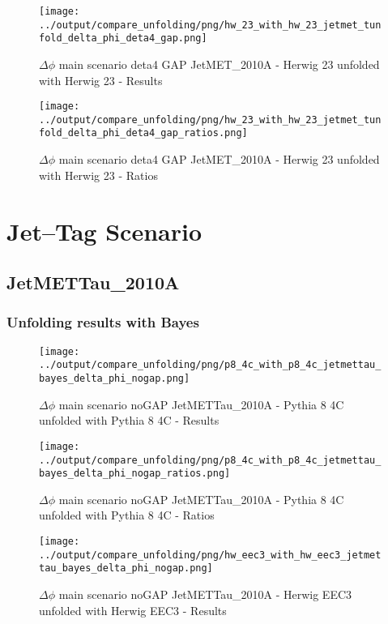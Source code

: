 \documentclass[11pt]{book}
\begin{document}
\begin{figure}[ht]
\centering
\texttt{[image: ../output/compare\_unfolding/png/hw\_23\_with\_hw\_23\_jetmet\_tunfold\_delta\_phi\_deta4\_gap.png]}
\caption{$\Delta\phi$ main scenario deta4 GAP JetMET\_2010A - Herwig 23 unfolded with Herwig 23 - Results}
\label{hw_23_hw_23_jetmet_tunfold_delta_phi_deta4_gap_a}
\end{figure}

\begin{figure}[ht]
\centering
\texttt{[image: ../output/compare\_unfolding/png/hw\_23\_with\_hw\_23\_jetmet\_tunfold\_delta\_phi\_deta4\_gap\_ratios.png]}
\caption{$\Delta\phi$ main scenario deta4 GAP JetMET\_2010A - Herwig 23 unfolded with Herwig 23 - Ratios}
\label{hw_23_hw_23_jetmet_tunfold_delta_phi_deta4_gap_b}
\end{figure}





\cleardoublepage
\chapter{Jet--Tag Scenario}
\section{JetMETTau\_2010A}
\subsection{Unfolding results with Bayes}

\begin{figure}[ht]
\centering
\texttt{[image: ../output/compare\_unfolding/png/p8\_4c\_with\_p8\_4c\_jetmettau\_bayes\_delta\_phi\_nogap.png]}
\caption{$\Delta\phi$ main scenario noGAP JetMETTau\_2010A - Pythia 8 4C unfolded with Pythia 8 4C - Results}
\label{p8_p8_jetmettau_bayes_delta_phi_nogap_a}
\end{figure}

\begin{figure}[ht]
\centering
\texttt{[image: ../output/compare\_unfolding/png/p8\_4c\_with\_p8\_4c\_jetmettau\_bayes\_delta\_phi\_nogap\_ratios.png]}
\caption{$\Delta\phi$ main scenario noGAP JetMETTau\_2010A - Pythia 8 4C unfolded with Pythia 8 4C - Ratios}
\label{p8_p8_jetmettau_bayes_delta_phi_nogap_b}
\end{figure}

\begin{figure}[ht]
\centering
\texttt{[image: ../output/compare\_unfolding/png/hw\_eec3\_with\_hw\_eec3\_jetmettau\_bayes\_delta\_phi\_nogap.png]}
\caption{$\Delta\phi$ main scenario noGAP JetMETTau\_2010A - Herwig EEC3 unfolded with Herwig EEC3 - Results}
\label{hw_eec3_hw_eec3_jetmettau_bayes_delta_phi_nogap_a}
\end{figure}
\end{document}
